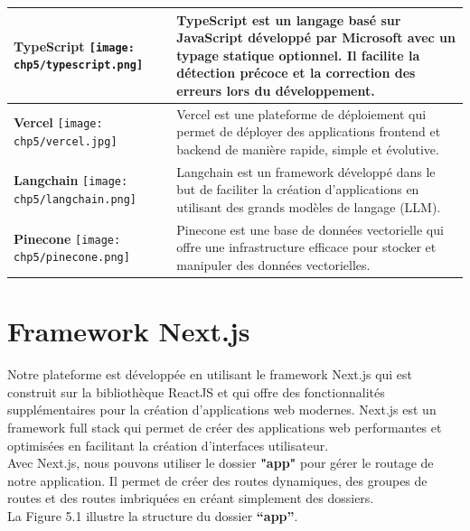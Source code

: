 \begin{longtable}{|p{4cm}|p{11cm}|}
    \hline
    \centering \textbf{TypeScript} \vspace{0.2cm} \newline \centering \texttt{[image: chp5/typescript.png]} & TypeScript est un langage basé sur JavaScript développé par Microsoft avec un typage statique optionnel. Il facilite la détection précoce et la correction des erreurs lors du développement. \\
    \hline
    \centering \textbf{Vercel} \vspace{0.2cm} \newline \centering \texttt{[image: chp5/vercel.jpg]} & Vercel est une plateforme de déploiement qui permet de déployer des applications frontend et backend de manière rapide, simple et évolutive. \\
    \hline
    \centering \textbf{Langchain} \vspace{0.2cm} \newline \centering \texttt{[image: chp5/langchain.png]} & Langchain est un framework développé dans le but de faciliter la création d'applications en utilisant des grands modèles de langage (LLM). \\
    \hline
    \centering \textbf{Pinecone} \vspace{0.2cm} \newline \centering \texttt{[image: chp5/pinecone.png]} & Pinecone est une base de données vectorielle qui offre une infrastructure efficace pour stocker et manipuler des données vectorielles. \\
    \hline
\end{longtable}

\section{Framework Next.js}
Notre plateforme est développée en utilisant le framework Next.js qui est construit sur la bibliothèque ReactJS et qui offre des fonctionnalités supplémentaires pour la création d'applications web modernes. Next.js est un framework full stack qui permet de créer des applications web performantes et optimisées en facilitant la création d'interfaces utilisateur.\\
Avec Next.js, nous pouvons utiliser le dossier \textbf{"app"} pour gérer le routage de notre application. Il permet de créer des routes dynamiques, des groupes de routes et des routes imbriquées en créant simplement des dossiers.\\
La Figure 5.1 illustre la structure du dossier \textbf{“app”}.\\


